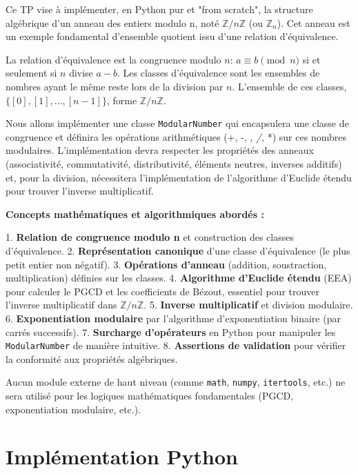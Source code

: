 \documentclass{report}
\begin{document}
Ce TP vise à implémenter, en Python pur et "from scratch", la structure algébrique d'un anneau des entiers modulo n, noté $\mathbb{Z}/n\mathbb{Z}$ (ou $\mathbb{Z}_n$). Cet anneau est un exemple fondamental d'ensemble quotient issu d'une relation d'équivalence.

La relation d'équivalence est la congruence modulo $n$: $a \equiv b \pmod n$ si et seulement si $n$ divise $a-b$. Les classes d'équivalence sont les ensembles de nombres ayant le même reste lors de la division par $n$. L'ensemble de ces classes, $\{[0], [1], \dots, [n-1]\}$, forme $\mathbb{Z}/n\mathbb{Z}$.

Nous allons implémenter une classe \texttt{ModularNumber} qui encapsulera une classe de congruence et définira les opérations arithmétiques (+, -, \textit{, /, }*) sur ces nombres modulaires. L'implémentation devra respecter les propriétés des anneaux (associativité, commutativité, distributivité, éléments neutres, inverses additifs) et, pour la division, nécessitera l'implémentation de l'algorithme d'Euclide étendu pour trouver l'inverse multiplicatif.

\textbf{Concepts mathématiques et algorithmiques abordés :}

1.  \textbf{Relation de congruence modulo n} et construction des classes d'équivalence.
2.  \textbf{Représentation canonique} d'une classe d'équivalence (le plus petit entier non négatif).
3.  \textbf{Opérations d'anneau} (addition, soustraction, multiplication) définies sur les classes.
4.  \textbf{Algorithme d'Euclide étendu} (EEA) pour calculer le PGCD et les coefficients de Bézout, essentiel pour trouver l'inverse multiplicatif dans $\mathbb{Z}/n\mathbb{Z}$.
5.  \textbf{Inverse multiplicatif} et division modulaire.
6.  \textbf{Exponentiation modulaire} par l'algorithme d'exponentiation binaire (par carrés successifs).
7.  \textbf{Surcharge d'opérateurs} en Python pour manipuler les \texttt{ModularNumber} de manière intuitive.
8.  \textbf{Assertions de validation} pour vérifier la conformité aux propriétés algébriques.

Aucun module externe de haut niveau (comme \texttt{math}, \texttt{numpy}, \texttt{itertools}, etc.) ne sera utilisé pour les logiques mathématiques fondamentales (PGCD, exponentiation modulaire, etc.).

\section*{Implémentation Python}
\end{document}
